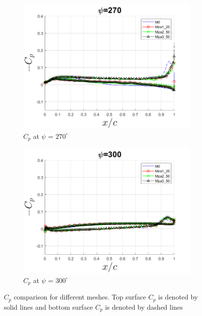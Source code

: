 \begin{figure}
\begin{subfigure}[b]{0.475\textwidth}
\centering
\includegraphics[width=1\textwidth]{figures/zonal_adapt_results/Cp/phase_270.png}
\caption{ $C_p$ at $\psi$ = $270^\circ$}
\label{fig:zonal_Cp_270}
\end{subfigure}
\begin{subfigure}[b]{0.475\textwidth}
\centering
\includegraphics[width=1\textwidth]{figures/zonal_adapt_results/Cp/phase_300.png}
\caption{ $C_p$ at $\psi$ = $300^\circ$}
\label{fig:zonal_Cp_300}
\end{subfigure}
\caption{$C_p$ comparison for different meshes. Top surface $C_p$ is denoted by solid lines and bottom surface $C_p$ is denoted by dashed lines}
\label{fig:zonal_Cp_plots_TEV}
\end{figure}


